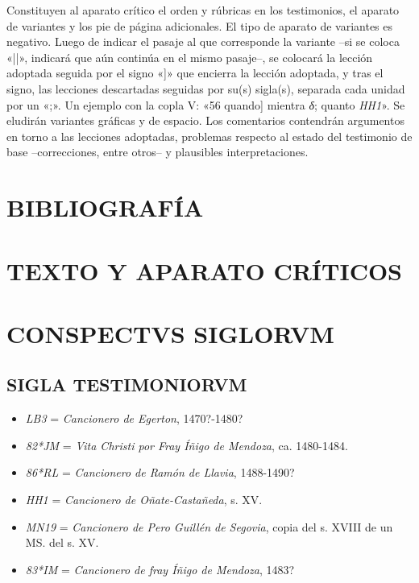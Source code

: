 \documentclass[11pt,a4paper,twoside]{article}
\newcommand{\comillas}[1]{«#1»}
\begin{document}
Constituyen al aparato crítico el orden y rúbricas en los testimonios, el aparato de variantes y los pie de página adicionales. El tipo de aparato de variantes es negativo. Luego de indicar el pasaje al que corresponde la variante --si se coloca \comillas{||}, indicará que aún continúa en el mismo pasaje--, se colocará la lección adoptada seguida por el signo \comillas{]} que encierra la lección adoptada, y tras el signo, las lecciones descartadas seguidas por su(s) sigla(s), separada cada unidad por un \comillas{;}. Un ejemplo con la copla V: \comillas{56 quando] mientra \textit{δ}; quanto \textit{HH1}}. Se eludirán variantes gráficas y de espacio. Los comentarios contendrán argumentos en torno a las lecciones adoptadas, problemas respecto al estado del testimonio de base --correcciones, entre otros-- y plausibles interpretaciones.

\section*{\fontsize{13}{14.35}\selectfont BIBLIOGRAFÍA}
\nocite{*}
\printbibliography[heading=none]
\newpage

\section*{\raggedleft \fontsize{13}{14.35}\selectfont TEXTO Y APARATO CRÍTICOS}
\newpage

\section*{\fontsize{13}{14.35}\selectfont CONSPECTVS SIGLORVM}

\subsection*{\fontsize{9.5}{11.96}\selectfont SIGLA TESTIMONIORVM}

\begin{itemize}[label=]%
\item \textit{LB3} = \textit{Cancionero de Egerton}, 1470?-1480?
\item \textit{82*JM} = \textit{Vita Christi por Fray Íñigo de Mendoza}, ca. 1480-1484.
\item \textit{86*RL} = \textit{Cancionero de Ramón de Llavia}, 1488-1490?
\item \textit{HH1} = \textit{Cancionero de Oñate-Castañeda}, s. XV.
\item \textit{MN19} = \textit{Cancionero de Pero Guillén de Segovia}, copia del s. XVIII de un MS. del s. XV.
\item \textit{83*IM} = \textit{Cancionero de fray Íñigo de Mendoza}, 1483?%
\end{itemize}
\end{document}
